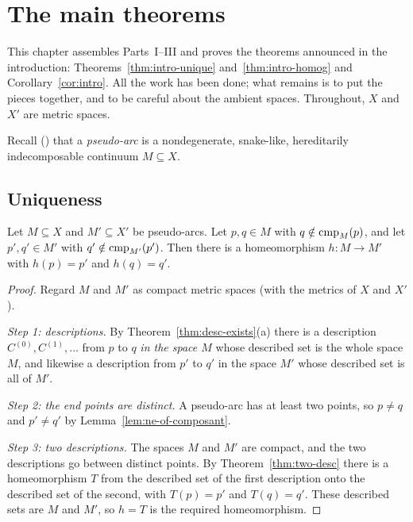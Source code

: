 \chapter{The main theorems}\label{ch:main}

This chapter assembles Parts~I--III and proves the theorems announced in the introduction:
Theorems~\ref{thm:intro-unique} and~\ref{thm:intro-homog} and Corollary~\ref{cor:intro}. All the
work has been done; what remains is to put the pieces together, and to be careful about the
ambient spaces. Throughout, $X$ and $X'$ are metric spaces.

Recall () that a \emph{pseudo-arc} is a nondegenerate, snake-like,
hereditarily indecomposable continuum $M\subseteq X$.


\section{Uniqueness}\label{sec:main-unique}

\begin{theorem}\label{thm:unique-points}
Let $M\subseteq X$ and $M'\subseteq X'$ be pseudo-arcs. Let $p,q\in M$ with $q\notin\operatorname{cmp}_{M}(p)$, and
let $p',q'\in M'$ with $q'\notin\operatorname{cmp}_{M'}(p')$. Then there is a homeomorphism $h\colon M\to M'$
with $h(p)=p'$ and $h(q)=q'$.
\end{theorem}

\begin{proof}
Regard $M$ and $M'$ as compact metric spaces (with the metrics of $X$ and $X'$).

\emph{Step 1: descriptions.} By Theorem~\ref{thm:desc-exists}(a) there is a description
$C^{(0)},C^{(1)},\dots$ from $p$ to $q$ \emph{in the space $M$} whose described set is the whole
space $M$, and likewise a description from $p'$ to $q'$ in the space $M'$ whose described set is
all of $M'$.

\emph{Step 2: the end points are distinct.} A pseudo-arc has at least two points, so $p\ne q$
and $p'\ne q'$ by Lemma~\ref{lem:ne-of-composant}.

\emph{Step 3: two descriptions.} The spaces $M$ and $M'$ are compact, and the two descriptions go
between distinct points. By Theorem~\ref{thm:two-desc} there is a homeomorphism $T$ from the
described set of the first description onto the described set of the second, with $T(p)=p'$ and
$T(q)=q'$. These described sets are $M$ and $M'$, so $h=T$ is the required homeomorphism.
\end{proof}

